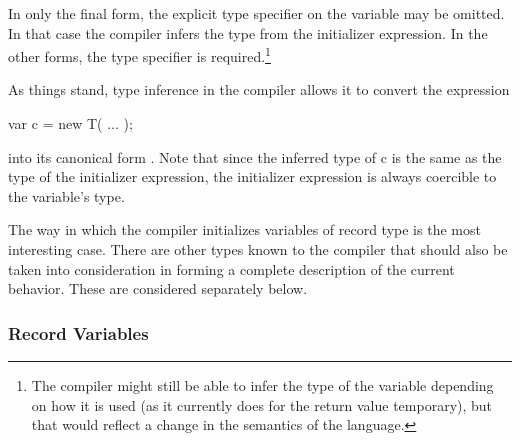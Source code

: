 In only the final form, the explicit type specifier on the variable may be omitted.  In that
case the compiler infers the type from the initializer expression.  In the other forms,
the type specifier is required.\footnote{The compiler might still be able to infer the type of the
variable depending on how it is used (as it currently does for the return value
temporary), but that would reflect a change in the semantics of the language.}

As things stand, type inference in the compiler allows it to convert the
expression
\begin{chapel}
   var c = new T( ... );
\end{chapel}
\noindent
into its canonical form .  Note that since the inferred type
of c is the same as the type of the initializer expression, the initializer expression is
always coercible to the variable's type.

The way in which the compiler initializes variables of record type is the most interesting
case.  There are other types known to the compiler that should also be taken into
consideration in forming a complete description of the current behavior.  These are
considered separately below.


\subsubsection{Record Variables}

